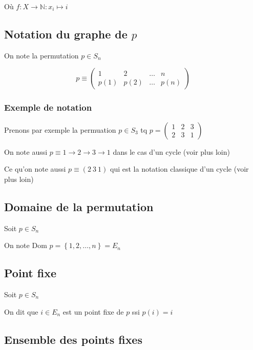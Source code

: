 \documentclass[a4paper,10pt]{article}
\newcommand{\dom}{\mbox{Dom }}
\newcommand{\ap}{\rightarrow}
\newcommand{\N}{\mathbb{N}}
\newcommand{\tset}[1]{\left\lbrace #1 \right\rbrace}
\begin{document}
Où $f : X \ap \N : x_i \mapsto i$

\subsection{Notation du graphe de $p$}

On note la permutation $p \in S_n$ 

$$
p \equiv \begin{pmatrix}
1 & 2 & \dots & n \\
p(1) & p(2) & \dots & p(n)
\end{pmatrix} 
$$

\subsubsection{Exemple de notation}

Prenons par exemple la permuation $p \in S_3$ tq $p = \begin{pmatrix} 1 & 2 & 3 \\ 2 & 3 & 1 \end{pmatrix}$

On note aussi $p \equiv 1 \ap 2 \ap 3 \ap 1$ dans le cas d'un cycle (voir plus loin)

Ce qu'on note aussi $p \equiv (2~3~1)$ qui est la notation classique d'un cycle (voir plus loin)

\subsection{Domaine de la permutation}


Soit $p \in S_n$

On note $\dom p = \tset{1, 2, \dots, n} = E_n$

\subsection{Point fixe}

Soit $p \in S_n$

On dit que $i \in E_n$ est un point fixe de $p$ ssi $p(i) = i$


\subsection{Ensemble des points fixes}
\end{document}
